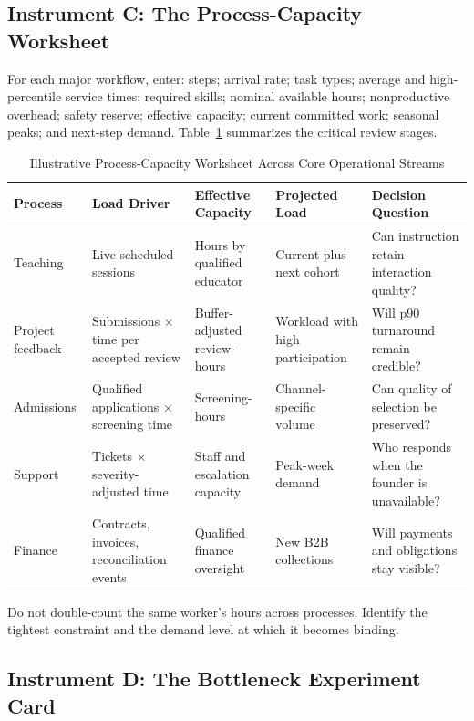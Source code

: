 \subsection{Instrument C: The Process-Capacity Worksheet}
\label{sec:instrument_c_process_capacity_worksheet}

For each major workflow, enter: steps; arrival rate; task types; average and high-percentile service times; required skills; nominal available hours; nonproductive overhead; safety reserve; effective capacity; current committed work; seasonal peaks; and next-step demand. Table~\ref{tab:process_capacity_summary} summarizes the critical review stages.

\begin{table}[t]
\centering
\small
\caption{Illustrative Process-Capacity Worksheet Across Core Operational Streams}
\label{tab:process_capacity_summary}
\begin{tabularx}{\textwidth}{l p{3.2cm} p{3.2cm} p{3.2cm} X}
\toprule
\textbf{Process} & \textbf{Load Driver} & \textbf{Effective Capacity} & \textbf{Projected Load} & \textbf{Decision Question} \\
\midrule
Teaching & Live scheduled sessions & Hours by qualified educator & Current plus next cohort & Can instruction retain interaction quality? \\
Project feedback & Submissions $\times$ time per accepted review & Buffer-adjusted review-hours & Workload with high participation & Will p90 turnaround remain credible? \\
Admissions & Qualified applications $\times$ screening time & Screening-hours & Channel-specific volume & Can quality of selection be preserved? \\
Support & Tickets $\times$ severity-adjusted time & Staff and escalation capacity & Peak-week demand & Who responds when the founder is unavailable? \\
Finance & Contracts, invoices, reconciliation events & Qualified finance oversight & New B2B collections & Will payments and obligations stay visible? \\
\bottomrule
\end{tabularx}
\end{table}

Do not double-count the same worker's hours across processes. Identify the tightest constraint and the demand level at which it becomes binding.

\subsection{Instrument D: The Bottleneck Experiment Card}
\label{sec:instrument_d_bottleneck_card}

